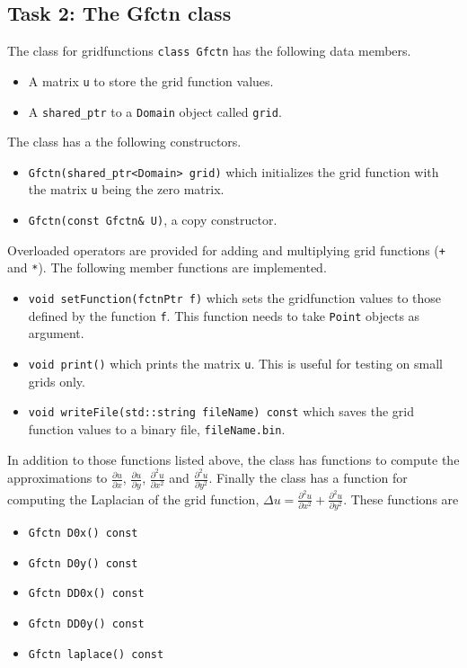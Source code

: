 \documentclass[a4paper,10pt]{article}
\begin{document}
\subsection*{Task 2: The Gfctn class}
The class for gridfunctions \texttt{class Gfctn} has the following data members.
\begin{itemize}
  \item
    A matrix \texttt{u} to store the grid function values.
  \item
    A \texttt{shared\_ptr} to a \texttt{Domain} object called \texttt{grid}.
\end{itemize}
The class has a the following constructors.
\begin{itemize}
  \item \texttt{Gfctn(shared\_ptr<Domain> grid)} which initializes the grid function with
    the matrix \texttt{u} being the zero matrix.
  \item \texttt{Gfctn(const Gfctn\& U)}, a copy constructor.
\end{itemize}
Overloaded operators are provided for adding and multiplying grid functions (\texttt{+} and 
\texttt{*}).
The following member functions are implemented.
\begin{itemize}
  \item
    \texttt{void setFunction(fctnPtr f)} which sets the gridfunction values to those
    defined by the function \texttt{f}. This function needs to take \texttt{Point}
    objects as argument.
  \item
    \texttt{void print()} which prints the matrix \texttt{u}.
    This is useful for testing on small grids only.
  \item
    \texttt{void writeFile(std::string fileName) const} which saves the grid function
    values to a binary file, \texttt{fileName.bin}.
\end{itemize}
In addition to those functions listed above, the class has functions to compute 
the approximations to $\tfrac{\partial u}{\partial x}$, $\tfrac{\partial u}{\partial y}$,
$\tfrac{\partial^2 u}{\partial x^2}$ and $\tfrac{\partial^2 u}{\partial y^2}$.
Finally the class has a function for computing the Laplacian of the grid function, 
$\Delta u = \tfrac{\partial^2 u}{\partial x^2} + \tfrac{\partial^2 u}{\partial y^2}$.
These functions are
\begin{itemize}
  \item
    \texttt{Gfctn D0x() const}
  \item
    \texttt{Gfctn D0y() const}
  \item
    \texttt{Gfctn DD0x() const}
  \item
    \texttt{Gfctn DD0y() const}
  \item
    \texttt{Gfctn laplace() const}
\end{itemize}
    
\end{document}
